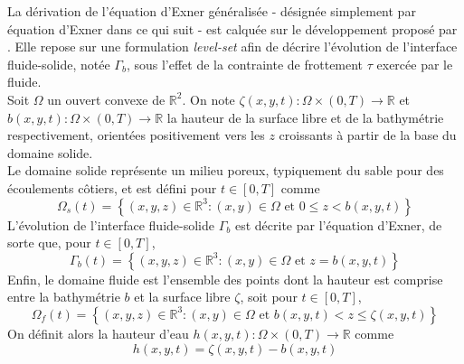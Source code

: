 \documentclass[11pt, a4paper, oneside]{report}
\begin{document}
La dérivation de l'équation d'Exner généralisée - désignée simplement par équation d'Exner dans ce qui suit - est calquée sur le développement proposé par \cite{ba2026coupled}. Elle repose sur une formulation \textit{level-set} afin de décrire l'évolution de l'interface fluide-solide, notée $\Gamma_b$, sous l'effet de la contrainte de frottement $\tau$ exercée par le fluide. \\

Soit $\Omega$ un ouvert convexe de $\mathbb{R}^2$. On note $\zeta(x, y, t) : \Omega \times (0, T) \longrightarrow \mathbb{R}$ et $b(x, y, t) : \Omega \times (0, T) \longrightarrow \mathbb{R}$ la hauteur de la surface libre et de la bathymétrie respectivement, orientées positivement vers les $z$ croissants à partir de la base du domaine solide. \\
Le domaine solide représente un milieu poreux, typiquement du sable pour des écoulements côtiers, et est défini pour $t \in [0, T]$ comme
\begin{equation}
    \Omega_s(t) = \left\{ (x, y, z) \in \mathbb{R}^3 : (x, y) \in \Omega \text{ et } 0 \leq z < b(x, y, t) \right\}
\end{equation}
L'évolution de l'interface fluide-solide $\Gamma_b$ est décrite par l'équation d'Exner, de sorte que, pour $t \in [0, T]$,
\begin{equation}
    \Gamma_b(t) = \left\{ (x, y, z) \in \mathbb{R}^3 : (x, y) \in \Omega \text{ et } z = b(x, y, t) \right\}
\end{equation}
Enfin, le domaine fluide est l'ensemble des points dont la hauteur est comprise entre la bathymétrie $b$ et la surface libre $\zeta$, soit pour $t \in [0, T]$,
\begin{equation}
    \Omega_f(t) = \left\{ (x, y, z) \in \mathbb{R}^3 : (x, y) \in \Omega \text{ et } b(x, y, t) < z \leq \zeta(x, y, t) \right\}
\end{equation}
On définit alors la hauteur d'eau $h(x, y, t) : \Omega \times (0, T) \longrightarrow \mathbb{R}$ comme
\begin{equation}
    h(x, y, t) = \zeta(x, y, t) - b(x, y, t)
\end{equation}
\end{document}
